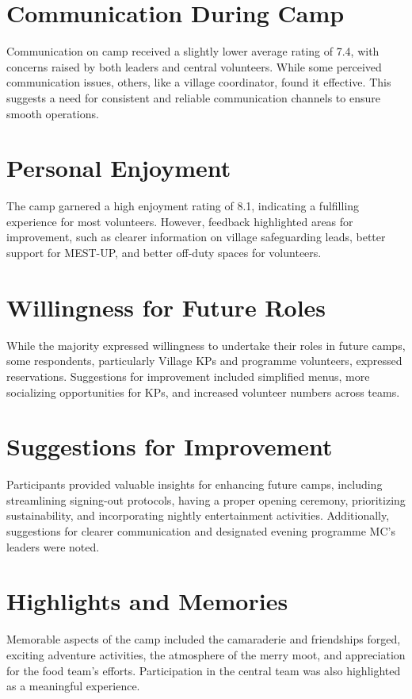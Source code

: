 \section{Communication During Camp}
Communication on camp received a slightly lower average rating of 7.4, with concerns raised by both leaders and central volunteers. While some perceived communication issues, others, like a village coordinator, found it effective. This suggests a need for consistent and reliable communication channels to ensure smooth operations.

\section{Personal Enjoyment}
The camp garnered a high enjoyment rating of 8.1, indicating a fulfilling experience for most volunteers. However, feedback highlighted areas for improvement, such as clearer information on village safeguarding leads, better support for MEST-UP, and better off-duty spaces for volunteers.

\section{Willingness for Future Roles}
While the majority expressed willingness to undertake their roles in future camps, some respondents, particularly Village KPs and programme volunteers, expressed reservations. Suggestions for improvement included simplified menus, more socializing opportunities for KPs, and increased volunteer numbers across teams.

\section{Suggestions for Improvement}
Participants provided valuable insights for enhancing future camps, including streamlining signing-out protocols, having a proper opening ceremony, prioritizing sustainability, and incorporating nightly entertainment activities. Additionally, suggestions for clearer communication and designated evening programme MC's leaders were noted.

\section{Highlights and Memories}
Memorable aspects of the camp included the camaraderie and friendships forged, exciting adventure activities, the atmosphere of the merry moot, and appreciation for the food team's efforts. Participation in the central team was also highlighted as a meaningful experience.